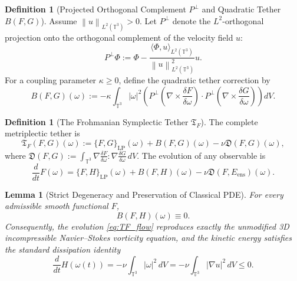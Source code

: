 \documentclass[11pt,reqno]{amsart}
\newtheorem{lemma}[theorem]{Lemma}
\theoremstyle{definition}
\newtheorem{definition}[theorem]{Definition}
\newcommand{\T}{\mathbb{T}^3}
\newcommand{\TF}{\mathfrak{T}_F}
\newcommand{\Pperp}{P^\perp}
\newcommand{\norm}[1]{\left\| #1 \right\|}
\newcommand{\abs}[1]{\left| #1 \right|}
\begin{document}
\begin{definition}[Projected Orthogonal Complement $\Pperp$ and Quadratic Tether $B(F, G)$]\label{def:B_tether}
Assume $\norm{u}_{L^2(\T)} > 0$. Let $\Pperp$ denote the $L^2$-orthogonal projection onto the orthogonal complement of the velocity field $u$:
\begin{equation}\label{eq:Pperp}
\Pperp \Phi := \Phi - \frac{\langle \Phi, u \rangle_{L^2(\T)}}{\norm{u}_{L^2(\T)}^2} u.
\end{equation}
For a coupling parameter $\kappa \ge 0$, define the quadratic tether correction by
\begin{equation}\label{eq:B_form}
B(F, G)(\omega) := -\kappa \int_{\T} \abs{\omega}^2 \left( \Pperp \left(\nabla \times \frac{\delta F}{\delta \omega}\right) \cdot \Pperp \left(\nabla \times \frac{\delta G}{\delta \omega}\right) \right) dV.
\end{equation}
\end{definition}

\begin{definition}[The Frohmanian Symplectic Tether $\TF$]\label{def:TF}
The complete metriplectic tether is
\begin{equation}\label{eq:TF_full}
\TF(F, G)(\omega) := \{F, G\}_{\mathrm{LP}}(\omega) + B(F, G)(\omega) - \nu \mathfrak{D}(F, G)(\omega),
\end{equation}
where $\mathfrak{D}(F, G) := \int_{\T} \nabla \frac{\delta F}{\delta \omega} : \nabla \frac{\delta G}{\delta \omega} \, dV$. The evolution of any observable is
\begin{equation}\label{eq:TF_flow}
\frac{d}{dt} F(\omega) = \{F, H\}_{\mathrm{LP}}(\omega) + B(F, H)(\omega) - \nu \mathfrak{D}(F, E_{\mathrm{ens}})(\omega).
\end{equation}
\end{definition}

\begin{lemma}[Strict Degeneracy and Preservation of Classical PDE]\label{lem:degeneracy}
For every admissible smooth functional $F$, 
\begin{equation}\label{eq:B_degeneracy}
B(F, H)(\omega) \equiv 0.
\end{equation}
Consequently, the evolution \eqref{eq:TF_flow} reproduces exactly the unmodified 3D incompressible Navier--Stokes vorticity equation, and the kinetic energy satisfies the standard dissipation identity
\begin{equation}\label{eq:energy_dissipation}
\frac{d}{dt} H(\omega(t)) = -\nu \int_{\T} \abs{\omega}^2 \, dV = -\nu \int_{\T} \abs{\nabla u}^2 \, dV \le 0.
\end{equation}
\end{lemma}
\end{document}

